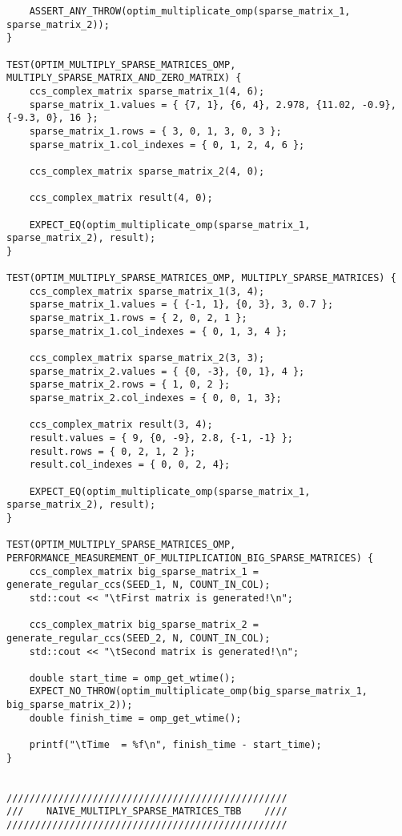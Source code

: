 \documentclass{report}
\begin{document}
\begin{lstlisting}
    ASSERT_ANY_THROW(optim_multiplicate_omp(sparse_matrix_1, sparse_matrix_2));
}

TEST(OPTIM_MULTIPLY_SPARSE_MATRICES_OMP, MULTIPLY_SPARSE_MATRIX_AND_ZERO_MATRIX) {
    ccs_complex_matrix sparse_matrix_1(4, 6);
    sparse_matrix_1.values = { {7, 1}, {6, 4}, 2.978, {11.02, -0.9}, {-9.3, 0}, 16 };
    sparse_matrix_1.rows = { 3, 0, 1, 3, 0, 3 };
    sparse_matrix_1.col_indexes = { 0, 1, 2, 4, 6 };

    ccs_complex_matrix sparse_matrix_2(4, 0);

    ccs_complex_matrix result(4, 0);

    EXPECT_EQ(optim_multiplicate_omp(sparse_matrix_1, sparse_matrix_2), result);
}

TEST(OPTIM_MULTIPLY_SPARSE_MATRICES_OMP, MULTIPLY_SPARSE_MATRICES) {
    ccs_complex_matrix sparse_matrix_1(3, 4);
    sparse_matrix_1.values = { {-1, 1}, {0, 3}, 3, 0.7 };
    sparse_matrix_1.rows = { 2, 0, 2, 1 };
    sparse_matrix_1.col_indexes = { 0, 1, 3, 4 };

    ccs_complex_matrix sparse_matrix_2(3, 3);
    sparse_matrix_2.values = { {0, -3}, {0, 1}, 4 };
    sparse_matrix_2.rows = { 1, 0, 2 };
    sparse_matrix_2.col_indexes = { 0, 0, 1, 3};

    ccs_complex_matrix result(3, 4);
    result.values = { 9, {0, -9}, 2.8, {-1, -1} };
    result.rows = { 0, 2, 1, 2 };
    result.col_indexes = { 0, 0, 2, 4};

    EXPECT_EQ(optim_multiplicate_omp(sparse_matrix_1, sparse_matrix_2), result);
}

TEST(OPTIM_MULTIPLY_SPARSE_MATRICES_OMP, PERFORMANCE_MEASUREMENT_OF_MULTIPLICATION_BIG_SPARSE_MATRICES) {
    ccs_complex_matrix big_sparse_matrix_1 = generate_regular_ccs(SEED_1, N, COUNT_IN_COL);
    std::cout << "\tFirst matrix is generated!\n";

    ccs_complex_matrix big_sparse_matrix_2 = generate_regular_ccs(SEED_2, N, COUNT_IN_COL);
    std::cout << "\tSecond matrix is generated!\n";

    double start_time = omp_get_wtime();
    EXPECT_NO_THROW(optim_multiplicate_omp(big_sparse_matrix_1, big_sparse_matrix_2));
    double finish_time = omp_get_wtime();

    printf("\tTime  = %f\n", finish_time - start_time);
}


/////////////////////////////////////////////////
///    NAIVE_MULTIPLY_SPARSE_MATRICES_TBB    ////
/////////////////////////////////////////////////


\end{lstlisting}
\end{document}

